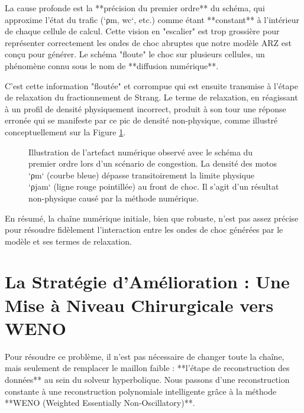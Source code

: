 La cause profonde est la **précision du premier ordre** du schéma, qui approxime l'état du trafic (`ρm, wc`, etc.) comme étant **constant** à l'intérieur de chaque cellule de calcul. Cette vision en "escalier" est trop grossière pour représenter correctement les ondes de choc abruptes que notre modèle ARZ est conçu pour générer. Le schéma "floute" le choc sur plusieurs cellules, un phénomène connu sous le nom de **diffusion numérique**.

C'est cette information "floutée" et corrompue qui est ensuite transmise à l'étape de relaxation du fractionnement de Strang. Le terme de relaxation, en réagissant à un profil de densité physiquement incorrect, produit à son tour une réponse erronée qui se manifeste par ce pic de densité non-physique, comme illustré conceptuellement sur la Figure \ref{fig:artefact_depassement_densite}.

\begin{figure}[h!]
    \centering
    \caption{Illustration de l'artefact numérique observé avec le schéma du premier ordre lors d'un scénario de congestion. La densité des motos `ρm` (courbe bleue) dépasse transitoirement la limite physique `ρjam` (ligne rouge pointillée) au front de choc. Il s'agit d'un résultat non-physique causé par la méthode numérique.}
    \label{fig:artefact_depassement_densite}
\end{figure}

En résumé, la chaîne numérique initiale, bien que robuste, n'est pas assez précise pour résoudre fidèlement l'interaction entre les ondes de choc générées par le modèle et ses termes de relaxation.

\section{La Stratégie d'Amélioration : Une Mise à Niveau Chirurgicale vers WENO}
\label{sec:strategie_weno}

Pour résoudre ce problème, il n'est pas nécessaire de changer toute la chaîne, mais seulement de remplacer le maillon faible : **l'étape de reconstruction des données** au sein du solveur hyperbolique. Nous passons d'une reconstruction constante à une reconstruction polynomiale intelligente grâce à la méthode **WENO (Weighted Essentially Non-Oscillatory)**.

